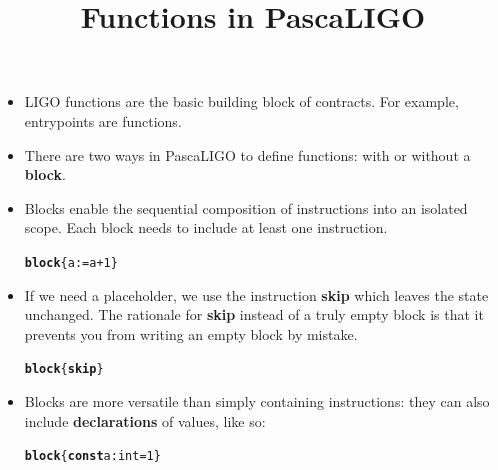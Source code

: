 \documentclass[wide]{slides}
\newcommand{\Kblock}[0]{\textbf{block}\xspace}
\newcommand{\Kconst}[0]{\textbf{const}\xspace}
\newcommand{\Kskip}[0]{\textbf{skip}\xspace}
\begin{document}
\begin{slide}
  \title{Functions in PascaLIGO}

  \begin{itemize}

    \item LIGO functions are the basic building block of
      contracts. For example, entrypoints are functions.

    \item There are two ways in PascaLIGO to define functions: with or
      without a \textbf{block}.

    \item Blocks enable the sequential composition of instructions
      into an isolated scope. Each block needs to include at least one
      instruction.
      \begin{alltt}
\Kblock \{ a := a + 1 \}
      \end{alltt}

    \item If we need a placeholder, we use the instruction \Kskip
      which leaves the state unchanged.  The rationale for \Kskip
      instead of a truly empty block is that it prevents you from
      writing an empty block by mistake.
      \begin{alltt}
\Kblock \{ \Kskip \}
      \end{alltt}

    \item Blocks are more versatile than simply containing
      instructions: they can also include \textbf{declarations} of
      values, like so:
      \begin{alltt}
\Kblock \{ \Kconst a : int = 1 \}
      \end{alltt}

  \end{itemize}

\end{slide}
\end{document}
